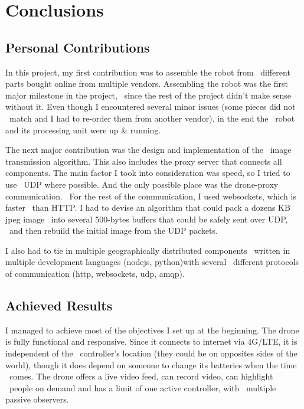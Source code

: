 
\chapter{Conclusions}
\label{ch:conclusions}

\section{Personal Contributions}
\label{sec:personal-contributions}

In this project, my first contribution was to assemble the robot from \
different parts bought online from multiple vendors.
Assembling the robot was the first major milestone in the project, \
since the rest of the project didn't make sense without it.
Even though I encountered several minor issues (some pieces did not \
match and I had to re-order them from another vendor), in the end the \
robot and its processing unit were up \& running.

The next major contribution was the design and implementation of the \
image transmission algorithm.
This also includes the proxy server that connects all components.
The main factor I took into consideration was speed, so I tried to use \
UDP where possible.
And the only possible place was the drone-proxy communication. \
For the rest of the communication, I used websockets, which is faster \
than HTTP.
I had to devise an algorithm that could pack a dozens KB jpeg image \
into several 500-bytes buffers that could be safely sent over UDP, \
and then rebuild the initial image from the UDP packets.

I also had to tie in multiple geographically distributed components \
written in multiple development languages (nodejs, python)with several \
different protocols of communication (http, websockets, udp, amqp).


\section{Achieved Results}
\label{sec:conclusions-achieved-results}
I managed to achieve most of the objectives I set up at the beginning.
The drone is fully functional and responsive.
Since it connects to internet via 4G/LTE, it is independent of the \
controller's location (they could be on opposites sides of the world),
though it does depend on someone to change its batteries when the time \
comes.
The drone offers a live video feed, can record video, can highlight \
people on demand and has a limit of one active controller, with \
multiple passive observers.

